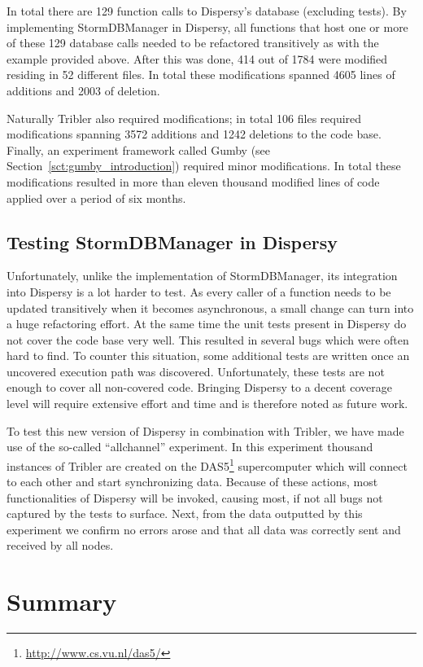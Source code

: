 In total there are 129 function calls to Dispersy's database (excluding tests).
By implementing StormDBManager in Dispersy, all functions that host one or more of these 129 database calls needed to be refactored transitively as with the example provided above.
After this was done, 414 out of 1784 were modified residing in 52 different files.
In total these modifications spanned 4605 lines of additions and 2003 of deletion.

Naturally Tribler also required modifications; in total 106 files required modifications spanning 3572 additions and 1242 deletions to the code base.
Finally, an experiment framework called Gumby (see Section~\ref{sct:gumby_introduction}) required minor modifications.
In total these modifications resulted in more than eleven thousand modified lines of code applied over a period of six months.

\subsection{Testing StormDBManager in Dispersy}

Unfortunately, unlike the implementation of StormDBManager, its integration into Dispersy is a lot harder to test.
As every caller of a function needs to be updated transitively when it becomes asynchronous, a small change can turn into a huge refactoring effort.
At the same time the unit tests present in Dispersy do not cover the code base very well.
This resulted in several bugs which were often hard to find.
To counter this situation, some additional tests are written once an uncovered execution path was discovered.
Unfortunately, these tests are not enough to cover all non-covered code.
Bringing Dispersy to a decent coverage level will require extensive effort and time and is therefore noted as future work.
 
To test this new version of Dispersy in combination with Tribler, we have made use of the so-called \enquote{allchannel} experiment.
In this experiment thousand instances of Tribler are created on the DAS5\footnote{\url{http://www.cs.vu.nl/das5/}} supercomputer which will connect to each other and start synchronizing data.
Because of these actions, most functionalities of Dispersy will be invoked, causing most, if not all bugs not captured by the tests to surface.
Next, from the data outputted by this experiment we confirm no errors arose and that all data was correctly sent and received by all nodes.

\section{Summary}

